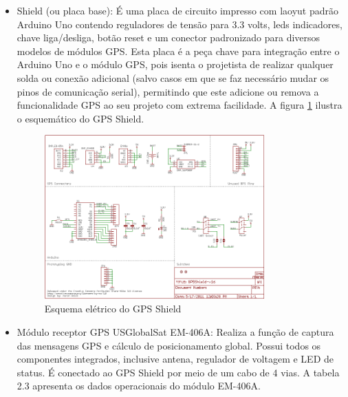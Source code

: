 \begin{itemize}
	\item Shield (ou placa base): É uma placa de circuito impresso com laoyut padrão Arduino Uno contendo reguladores de tensão para 3.3 volts, leds indicadores, chave liga/desliga, botão reset e um conector padronizado para diversos modelos de módulos GPS. Esta placa é a peça chave para integração entre o Arduino Uno e o módulo GPS, pois isenta o projetista de realizar qualquer solda ou conexão adicional (salvo casos em que se faz necessário mudar os pinos de comunicação serial), permitindo que este adicione ou remova a funcionalidade GPS ao seu projeto com extrema facilidade. A figura \ref{fig:esquemagpdshield} ilustra o esquemático do GPS Shield.

\begin{figure}[h!]
			\centering
			\includegraphics[width=0.8\textwidth]{figures/schemaGPS.png}
			\caption{Esquema elétrico do GPS Shield}
			\label{fig:esquemagpdshield}
\end{figure}


	\item Módulo receptor GPS USGlobalSat EM-406A: Realiza a função de captura das mensagens GPS e cálculo de posicionamento global. Possui todos os componentes integrados, inclusive antena, regulador de voltagem e LED de status. É conectado ao GPS Shield por meio de um cabo de 4 vias. A tabela 2.3 apresenta os dados operacionais do módulo EM-406A.	
\end{itemize}

